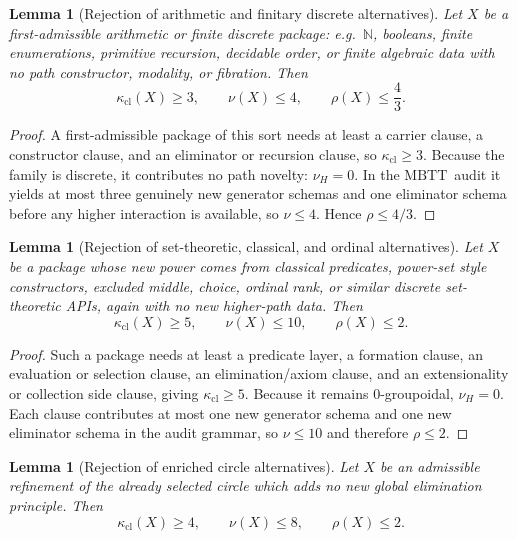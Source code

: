 \documentclass{lmcs}
\theoremstyle{plain}
\newtheorem{lem}[thm]{Lemma}
\theoremstyle{definition}
\theoremstyle{remark}
\newcommand{\N}{\ensuremath{\mathbb{N}}}
\newcommand{\MBTT}{\ensuremath{\mathrm{MBTT}}}
\begin{document}
\begin{lem}[Rejection of arithmetic and finitary discrete alternatives]
\label{lem:reject-arithmetic}
Let $X$ be a first-admissible arithmetic or finite discrete package: e.g.\ $\N$, booleans, finite enumerations, primitive recursion, decidable order, or finite algebraic data with no path constructor, modality, or fibration.
Then
\[
  \kappa_{\mathrm{cl}}(X)\ge 3,\qquad \nu(X)\le 4,\qquad \rho(X)\le \frac43.
\]
\end{lem}

\begin{proof}
A first-admissible package of this sort needs at least a carrier clause, a constructor clause, and an eliminator or recursion clause, so $\kappa_{\mathrm{cl}}\ge 3$.
Because the family is discrete, it contributes no path novelty: $\nu_H=0$.
In the \MBTT\ audit it yields at most three genuinely new generator schemas and one eliminator schema before any higher interaction is available, so $\nu\le 4$.
Hence $\rho\le 4/3$.
\end{proof}

\begin{lem}[Rejection of set-theoretic, classical, and ordinal alternatives]
\label{lem:reject-setclass}
Let $X$ be a package whose new power comes from classical predicates, power-set style constructors, excluded middle, choice, ordinal rank, or similar discrete set-theoretic APIs, again with no new higher-path data.
Then
\[
  \kappa_{\mathrm{cl}}(X)\ge 5,\qquad \nu(X)\le 10,\qquad \rho(X)\le 2.
\]
\end{lem}

\begin{proof}
Such a package needs at least a predicate layer, a formation clause, an evaluation or selection clause, an elimination/axiom clause, and an extensionality or collection side clause, giving $\kappa_{\mathrm{cl}}\ge 5$.
Because it remains 0-groupoidal, $\nu_H=0$.
Each clause contributes at most one new generator schema and one new eliminator schema in the audit grammar, so $\nu\le 10$ and therefore $\rho\le 2$.
\end{proof}

\begin{lem}[Rejection of enriched circle alternatives]
\label{lem:reject-circle}
Let $X$ be an admissible refinement of the already selected circle which adds no new global elimination principle.
Then
\[
  \kappa_{\mathrm{cl}}(X)\ge 4,\qquad \nu(X)\le 8,\qquad \rho(X)\le 2.
\]
\end{lem}
\end{document}
